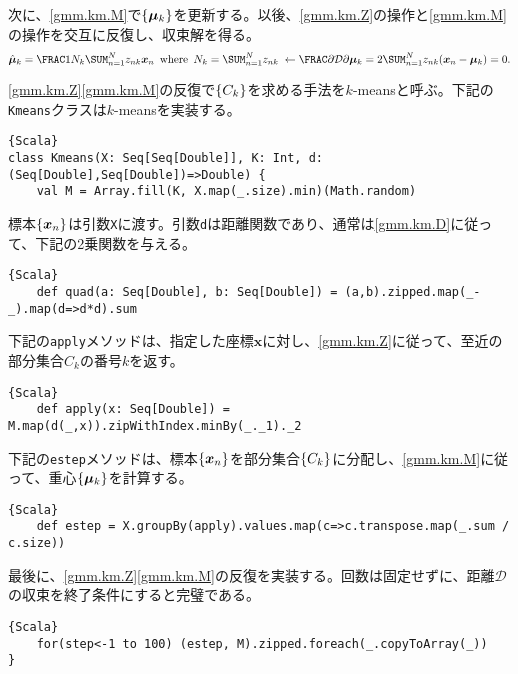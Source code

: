 \documentclass[10pt,a4paper]{book}
\begin{document}
次に、\eqref{gmm.km.M}で$\seq{\bm{\mu}_k}$を更新する。以後、\eqref{gmm.km.Z}の操作と\eqref{gmm.km.M}の操作を交互に反復し、収束解を得る。
%
\begin{equation}
\label{eq:gmm.km.M}
\hat{\bm{\mu}}_k = \frac{1}{N_k} \sum_{n=1}^N z_{nk} \bm{x}_n \where N_k = \sum_{n=1}^N z_{nk}\;
\leftarrow \pdiff{\mathcal{D}}{\bm{\mu}_k} = 2\sum_{n=1}^N z_{nk} (\bm{x}_n-\bm{\mu}_k) = 0.
\end{equation}

\eqref{gmm.km.Z}\eqref{gmm.km.M}の反復で$\seq{C_k}$を求める手法を$k$-meansと呼ぶ。下記の\texttt{Kmeans}クラスは$k$-meansを実装する。

\begin{Verbatim}{Scala}
class Kmeans(X: Seq[Seq[Double]], K: Int, d: (Seq[Double],Seq[Double])=>Double) {
	val M = Array.fill(K, X.map(_.size).min)(Math.random)
\end{Verbatim}

標本$\seq{\bm{x}_n}$は引数\texttt{X}に渡す。引数\texttt{d}は距離関数であり、通常は\eqref{gmm.km.D}に従って、下記の2乗関数を与える。

\begin{Verbatim}{Scala}
	def quad(a: Seq[Double], b: Seq[Double]) = (a,b).zipped.map(_-_).map(d=>d*d).sum
\end{Verbatim}

下記の\texttt{apply}メソッドは、指定した座標$\bm{x}$に対し、\eqref{gmm.km.Z}に従って、至近の部分集合$C_k$の番号$k$を返す。

\begin{Verbatim}{Scala}
	def apply(x: Seq[Double]) = M.map(d(_,x)).zipWithIndex.minBy(_._1)._2
\end{Verbatim}

下記の\texttt{estep}メソッドは、標本$\seq{\bm{x}_n}$を部分集合$\seq{C_k}$に分配し、\eqref{gmm.km.M}に従って、重心$\seq{\bm{\mu}_k}$を計算する。

\begin{Verbatim}{Scala}
	def estep = X.groupBy(apply).values.map(c=>c.transpose.map(_.sum / c.size))
\end{Verbatim}

最後に、\eqref{gmm.km.Z}\eqref{gmm.km.M}の反復を実装する。回数は固定せずに、距離$\mathcal{D}$の収束を終了条件にすると完璧である。

\begin{Verbatim}{Scala}
	for(step<-1 to 100) (estep, M).zipped.foreach(_.copyToArray(_))
}
\end{Verbatim}
\end{document}
